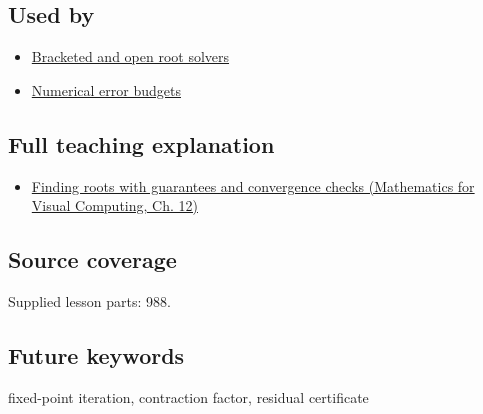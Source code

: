 \subsection{Used by}\label{appendix-d83b0ad1be7f-used-by}

\begin{itemize}
\tightlist
\item
  \hyperref[appendix-f63eb850796d]{Bracketed and open root solvers}
\item
  \hyperref[appendix-31b8c295e05f]{Numerical error budgets}
\end{itemize}

\subsection{Full teaching explanation}\label{appendix-d83b0ad1be7f-full-teaching-explanation}

\begin{itemize}
\tightlist
\item
  \href{../02-Mathematics-for-Visual-Computing/main.pdf\#nameddest=02-foundations-ii-ch028-finding-roots-with-guarantees-and-convergence-checks}{Finding roots with guarantees and convergence checks (Mathematics for Visual Computing, Ch. 12)}
\end{itemize}

\subsection{Source coverage}\label{appendix-d83b0ad1be7f-source-coverage}

Supplied lesson parts: 988.

\subsection{Future keywords}\label{appendix-d83b0ad1be7f-future-keywords}

fixed-point iteration, contraction factor, residual certificate
